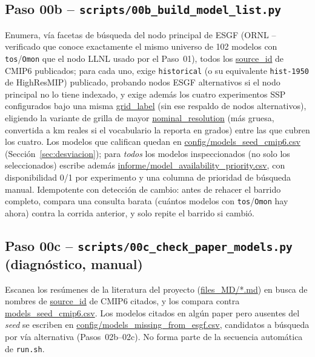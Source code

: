 \documentclass[11pt,a4paper]{article}
\newcommand{\archivo}[1]{\begingroup\hypersetup{urlcolor=black}\url{#1}\endgroup}
\begin{document}
\subsection{Paso 00b -- \texttt{scripts/00b\_build\_model\_list.py}}
Enumera, v\'ia facetas de b\'usqueda del nodo principal de ESGF (ORNL -- verificado que conoce exactamente el mismo universo de 102 modelos con \texttt{tos}/\texttt{Omon} que el nodo LLNL usado por el Paso~01), todos los \archivo{source_id} de CMIP6 publicados; para cada uno, exige \texttt{historical} (o su equivalente \texttt{hist-1950} de HighResMIP) publicado, probando nodos ESGF alternativos si el nodo principal no lo tiene indexado, y exige adem\'as los cuatro experimentos SSP configurados bajo una misma \archivo{grid_label} (sin ese respaldo de nodos alternativos), eligiendo la variante de grilla de mayor \archivo{nominal_resolution} (m\'as gruesa, convertida a km reales si el vocabulario la reporta en grados) entre las que cubren los cuatro. Los modelos que califican quedan en \archivo{config/models_seed_cmip6.csv} (Secci\'on~\ref{sec:desviacion}); para \emph{todos} los modelos inspeccionados (no solo los seleccionados) escribe adem\'as \archivo{informe/model_availability_priority.csv}, con disponibilidad 0/1 por experimento y una columna de prioridad de b\'usqueda manual. Idempotente con detecci\'on de cambio: antes de rehacer el barrido completo, compara una consulta barata (cu\'antos modelos con \texttt{tos}/\texttt{Omon} hay ahora) contra la corrida anterior, y solo repite el barrido si cambi\'o.

\subsection{Paso 00c -- \texttt{scripts/00c\_check\_paper\_models.py} (diagn\'ostico, manual)}
Escanea los resúmenes de la literatura del proyecto (\archivo{files_MD/*.md}) en busca de nombres de \archivo{source_id} de CMIP6 citados, y los compara contra \archivo{models_seed_cmip6.csv}. Los modelos citados en alg\'un paper pero ausentes del \emph{seed} se escriben en \archivo{config/models_missing_from_esgf.csv}, candidatos a b\'usqueda por v\'ia alternativa (Pasos~02b--02c). No forma parte de la secuencia autom\'atica de \texttt{run.sh}.
\end{document}
